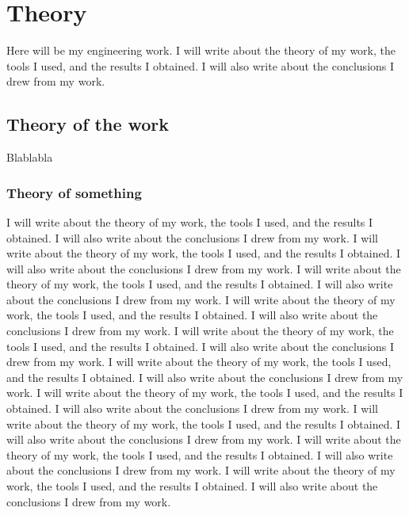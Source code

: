 \newpage
\section{Theory}

Here will be my engineering work.
I will write about the theory of my work, the tools I used, and the results I obtained. I will also write about the conclusions I drew from my work.

\subsection{Theory of the work}\label{subsec:theory-of-the-work}

Blablabla

\subsubsection{Theory of something}\label{subsubsec:theory-of-something}
\qquad I will write about the theory of my work, the tools I used, and the results I obtained. I will also write about the conclusions I drew from my work.
I will write about the theory of my work, the tools I used, and the results I obtained. I will also write about the conclusions I drew from my work.
I will write about the theory of my work, the tools I used, and the results I obtained. I will also write about the conclusions I drew from my work.
I will write about the theory of my work, the tools I used, and the results I obtained. I will also write about the conclusions I drew from my work.
I will write about the theory of my work, the tools I used, and the results I obtained. I will also write about the conclusions I drew from my work.
I will write about the theory of my work, the tools I used, and the results I obtained. I will also write about the conclusions I drew from my work.
I will write about the theory of my work, the tools I used, and the results I obtained. I will also write about the conclusions I drew from my work.
I will write about the theory of my work, the tools I used, and the results I obtained. I will also write about the conclusions I drew from my work.
I will write about the theory of my work, the tools I used, and the results I obtained. I will also write about the conclusions I drew from my work.
I will write about the theory of my work, the tools I used, and the results I obtained. I will also write about the conclusions I drew from my work.
